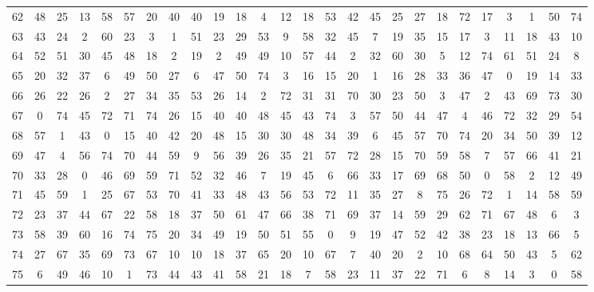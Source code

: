 \begin{table}
\begin{tabular}{c c c c c c c c c c c c c c c c c c c c c c c c c c }
62 & 48 & 25 & 13 & 58 & 57 & 20 & 40 & 40 & 19 & 18 & 4 & 12 & 18 & 53 & 42 & 45 & 25 & 27 & 18 & 72 & 17 & 3 & 1 & 50 & 74 \\
63 & 43 & 24 & 2 & 60 & 23 & 3 & 1 & 51 & 23 & 29 & 53 & 9 & 58 & 32 & 45 & 7 & 19 & 35 & 15 & 17 & 3 & 11 & 18 & 43 & 10 \\
64 & 52 & 51 & 30 & 45 & 48 & 18 & 2 & 19 & 2 & 49 & 49 & 10 & 57 & 44 & 2 & 32 & 60 & 30 & 5 & 12 & 74 & 61 & 51 & 24 & 8 \\
65 & 20 & 32 & 37 & 6 & 49 & 50 & 27 & 6 & 47 & 50 & 74 & 3 & 16 & 15 & 20 & 1 & 16 & 28 & 33 & 36 & 47 & 0 & 19 & 14 & 33 \\
66 & 26 & 22 & 26 & 2 & 27 & 34 & 35 & 53 & 26 & 14 & 2 & 72 & 31 & 31 & 70 & 30 & 23 & 50 & 3 & 47 & 2 & 43 & 69 & 73 & 30 \\
67 & 0 & 74 & 45 & 72 & 71 & 74 & 26 & 15 & 40 & 40 & 48 & 45 & 43 & 74 & 3 & 57 & 50 & 44 & 47 & 4 & 46 & 72 & 32 & 29 & 54 \\
68 & 57 & 1 & 43 & 0 & 15 & 40 & 42 & 20 & 48 & 15 & 30 & 30 & 48 & 34 & 39 & 6 & 45 & 57 & 70 & 74 & 20 & 34 & 50 & 39 & 12 \\
69 & 47 & 4 & 56 & 74 & 70 & 44 & 59 & 9 & 56 & 39 & 26 & 35 & 21 & 57 & 72 & 28 & 15 & 70 & 59 & 58 & 7 & 57 & 66 & 41 & 21 \\
70 & 33 & 28 & 0 & 46 & 69 & 59 & 71 & 52 & 32 & 46 & 7 & 19 & 45 & 6 & 66 & 33 & 17 & 69 & 68 & 50 & 0 & 58 & 2 & 12 & 49 \\
71 & 45 & 59 & 1 & 25 & 67 & 53 & 70 & 41 & 33 & 48 & 43 & 56 & 53 & 72 & 11 & 35 & 27 & 8 & 75 & 26 & 72 & 1 & 14 & 58 & 59 \\
72 & 23 & 37 & 44 & 67 & 22 & 58 & 18 & 37 & 50 & 61 & 47 & 66 & 38 & 71 & 69 & 37 & 14 & 59 & 29 & 62 & 71 & 67 & 48 & 6 & 3 \\
73 & 58 & 39 & 60 & 16 & 74 & 75 & 20 & 34 & 49 & 19 & 50 & 51 & 55 & 0 & 9 & 19 & 47 & 52 & 42 & 38 & 23 & 18 & 13 & 66 & 5 \\
74 & 27 & 67 & 35 & 69 & 73 & 67 & 10 & 10 & 18 & 37 & 65 & 20 & 10 & 67 & 7 & 40 & 20 & 2 & 10 & 68 & 64 & 50 & 43 & 5 & 62 \\
75 & 6 & 49 & 46 & 10 & 1 & 73 & 44 & 43 & 41 & 58 & 21 & 18 & 7 & 58 & 23 & 11 & 37 & 22 & 71 & 6 & 8 & 14 & 3 & 0 & 58 \\
\hline
\end{tabular}
\end{table}
